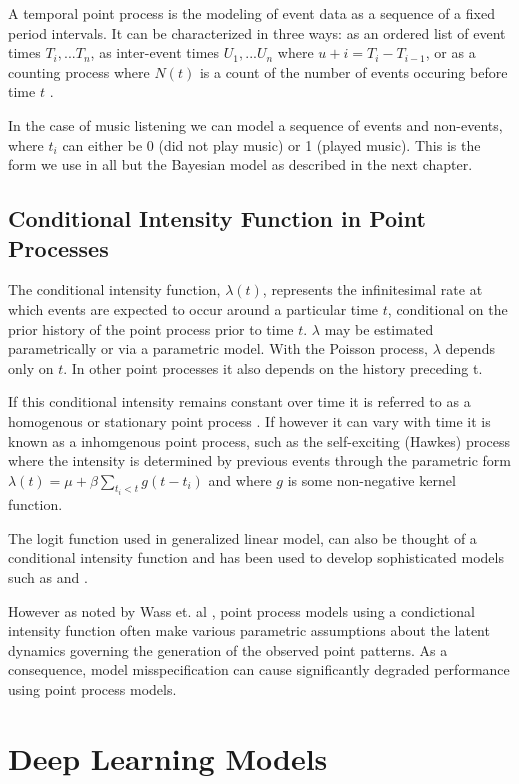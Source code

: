 A temporal point process is the modeling of event data as a sequence of a fixed period intervals. It can be characterized in three ways: as an ordered list of event times ${T_i,...T_n}$, as inter-event times $U_1,...U_n$ where $u+i = T_i-T_{i-1}$, or as a counting process where  $N(t)$ is a count of the number of events occuring before time $t$ \parencite{Borgan}.

In the case of music listening we can model a sequence of events and non-events, where $t_i$ can either be 0 (did not play music) or 1 (played music). This is the form we use in all but the Bayesian model as described in the next chapter.

\subsection{Conditional Intensity Function in Point Processes}

The conditional intensity function, $\lambda(t)$, represents the infinitesimal rate at which events are expected to occur around a particular time 
$t$, conditional on the prior history of the point 
process prior to time $t$. $\lambda$ may be estimated parametrically \parencite{DuWang} or via a parametric model. With the Poisson process, $\lambda$ depends only on $t$. In other point processes it also depends on the history preceding t. 
 
If this conditional intensity remains constant over time it is referred to as a homogenous or stationary point process \parencite{Nok}. If however it can vary with time it is known as a inhomgenous point process, such as the self-exciting (Hawkes) process where the intensity is determined by previous events through the parametric form $\lambda(t) = \mu + \beta \sum_{t_i<t}g(t-t_i)$ and where $g$ is some non-negative kernel function.

The logit function used in generalized linear model, can also be thought of a conditional intensity function and has been used to develop sophisticated models such as \parencite{baddeley2014logistic} and \parencite{rajala2014note}.

However as noted by Wass et. al \parencite{Wass}, point process models using a condictional intensity function often make various parametric assumptions about the latent dynamics governing the generation of the observed point patterns. As a consequence, model misspecification can cause significantly degraded performance using point process models.

\section{Deep Learning Models}

